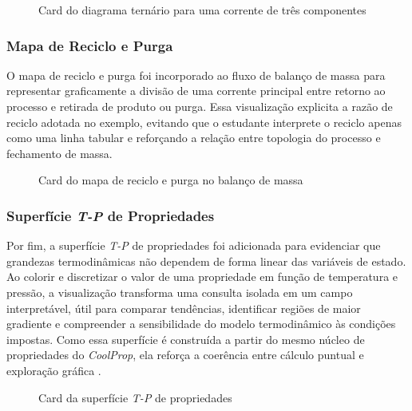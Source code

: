 \begin{figure}[H]
    \centering
    \caption{Card do diagrama ternário para uma corrente de três componentes}
    \label{fig:viz_ternario}
\end{figure}

\subsubsection{Mapa de Reciclo e Purga}

O mapa de reciclo e purga foi incorporado ao fluxo de balanço de massa para representar graficamente a divisão de uma corrente principal entre retorno ao processo e retirada de produto ou purga. Essa visualização explicita a razão de reciclo adotada no exemplo, evitando que o estudante interprete o reciclo apenas como uma linha tabular e reforçando a relação entre topologia do processo e fechamento de massa.

\begin{figure}[H]
    \centering
    \caption{Card do mapa de reciclo e purga no balanço de massa}
    \label{fig:viz_reciclo_purga}
\end{figure}

\subsubsection{Superfície \textit{T-P} de Propriedades}

Por fim, a superfície \textit{T-P} de propriedades foi adicionada para evidenciar que grandezas termodinâmicas não dependem de forma linear das variáveis de estado. Ao colorir e discretizar o valor de uma propriedade em função de temperatura e pressão, a visualização transforma uma consulta isolada em um campo interpretável, útil para comparar tendências, identificar regiões de maior gradiente e compreender a sensibilidade do modelo termodinâmico às condições impostas. Como essa superfície é construída a partir do mesmo núcleo de propriedades do \textit{CoolProp}, ela reforça a coerência entre cálculo puntual e exploração gráfica \cite{bell2014,poling2001}.

\begin{figure}[H]
    \centering
    \caption{Card da superfície \textit{T-P} de propriedades}
    \label{fig:viz_superficie_tp}
\end{figure}

